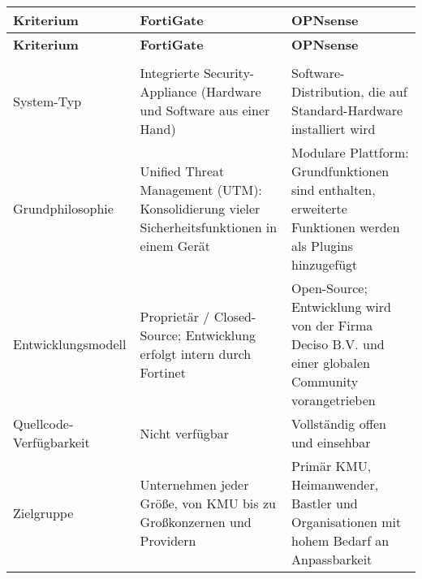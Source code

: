 	\begin{longtable}{>{\RaggedRight}p{} >{\RaggedRight}p{} >{\RaggedRight}p{}}
	\toprule
	\textbf{Kriterium} & \textbf{FortiGate} & \textbf{OPNsense} \\
	\midrule
	\endfirsthead
	
	\toprule
	\textbf{Kriterium} & \textbf{FortiGate} & \textbf{OPNsense} \\
	\midrule
	\endhead
	
	\bottomrule
	\endfoot
	
	\bottomrule
	\endlastfoot
	
	
	\multicolumn{3}{l}{\textbf{I. Grundlegende Architektur \& Philosophie}} \\
	\midrule
	System-Typ & Integrierte Security-Appliance (Hardware und Software aus einer Hand) & Software-Distribution, die auf Standard-Hardware installiert wird \\
	\addlinespace
	Grundphilosophie & Unified Threat Management (UTM): Konsolidierung vieler Sicherheitsfunktionen in einem Gerät & Modulare Plattform: Grundfunktionen sind enthalten, erweiterte Funktionen werden als Plugins hinzugefügt \\
	\addlinespace
	Entwicklungsmodell & Proprietär / Closed-Source; Entwicklung erfolgt intern durch Fortinet & Open-Source; Entwicklung wird von der Firma Deciso B.V. und einer globalen Community vorangetrieben \\
	\addlinespace
	Quellcode-Verfügbarkeit & Nicht verfügbar & Vollständig offen und einsehbar \\
	\addlinespace
	Zielgruppe & Unternehmen jeder Größe, von KMU bis zu Großkonzernen und Providern & Primär KMU, Heimanwender, Bastler und Organisationen mit hohem Bedarf an Anpassbarkeit \\
	\midrule
	

\end{longtable}
